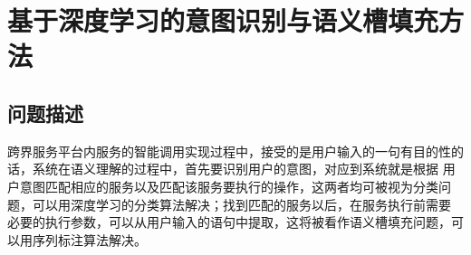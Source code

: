 \chapter{基于深度学习的意图识别与语义槽填充方法}

\section{问题描述}
跨界服务平台内服务的智能调用实现过程中，接受的是用户输入的一句有目的性的话，系统在语义理解的过程中，首先要识别用户的意图，对应到系统就是根据
用户意图匹配相应的服务以及匹配该服务要执行的操作，这两者均可被视为分类问题，可以用深度学习的分类算法解决；找到匹配的服务以后，在服务执行前需要
必要的执行参数，可以从用户输入的语句中提取，这将被看作语义槽填充问题，可以用序列标注算法解决。







